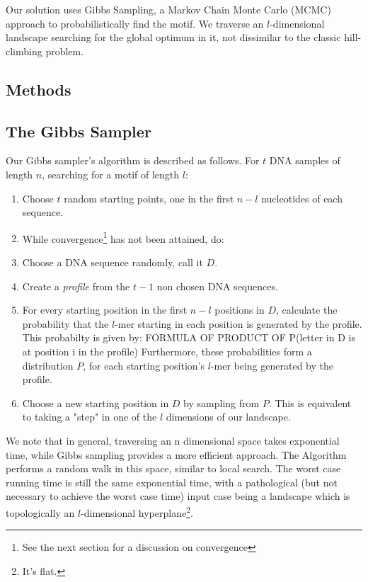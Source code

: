 \documentclass{bioinfo}
\begin{document}
Our solution uses Gibbs Sampling, a Markov Chain Monte Carlo (MCMC) approach to probabilistically find the motif. We traverse an $l$-dimensional landscape searching for the global optimum in it, not dissimilar to the classic hill-climbing problem.
\begin{methods}
\section{Methods}
\subsection{The Gibbs Sampler}
Our Gibbs sampler's algorithm is described as follows.
For $t$ DNA samples of length $n$, searching for a motif of length $l$:\\
\begin{enumerate}
    \item Choose $t$ random starting points, one in the first $n - l$ nucleotides of each sequence.
    
    \item While convergence\footnote{See the next section for a discussion on convergence} has not been attained, do:
    \item Choose a DNA sequence randomly, call it $D$.
    \item Create a \textit{profile} from the $t - 1$ non chosen DNA sequences.
    \item For every starting position in the first $n - l$ positions in $D$, calculate the probability that the $l$-mer starting in each position is generated by the profile. This probabilty is given by:
        FORMULA OF PRODUCT OF P(letter in D is at position i in the profile)
    Furthermore, these probabilities form a distribution $P$, for each starting position's $l$-mer being generated by the profile.
    \item Choose a new starting position in $D$ by sampling from $P$. This is equivalent to taking a "step" in one of the $l$ dimensions of our landscape.
\end{enumerate}

We note that in general, traversing an n dimensional space takes exponential time, while Gibbs sampling provides a more efficient approach. The Algorithm performs a random walk in this space, similar to local search. The worst case running time is still the same exponential time, with a pathological (but not necessary to achieve the worst case time) input case being a landscape which is topologically an $l$-dimensional hyperplane\footnote{It's flat.}.

\end{methods}
\end{document}
